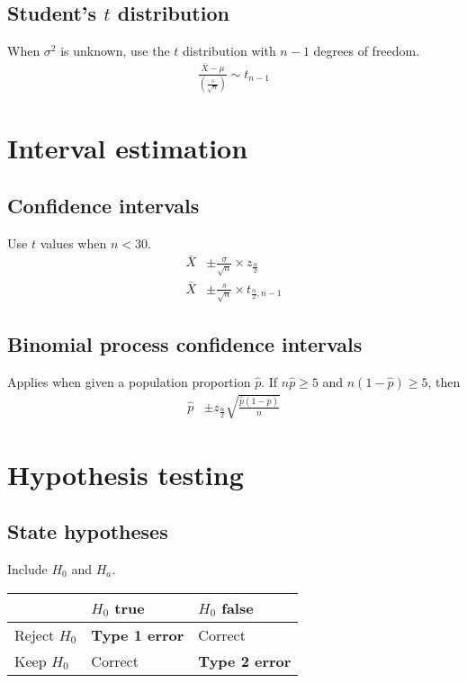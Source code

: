 \documentclass{article}
\newcommand{\soft}[1]{\left( #1 \right)}
\begin{document}
\begin{multicols*}{2}
\subsection{Student's $t$ distribution}
When $\sigma^2$ is unknown, use the $t$ distribution with $n - 1$ degrees of freedom.
\begin{align*}
    \frac{\bar{X} - \mu}{\soft{\frac{s}{\sqrt{n}}}} \sim t_{n - 1}
\end{align*}

\section{Interval estimation}

\subsection{Confidence intervals}
Use $t$ values when $n < 30$.
\begin{align*}
    \bar{X} &\pm \frac{\sigma}{\sqrt{n}} \times z_{\frac{\alpha}{2}} \\
    \bar{X} &\pm \frac{s}{\sqrt{n}} \times t_{\frac{\alpha}{2}, n - 1}
\end{align*}

\subsection{Binomial process confidence intervals}
Applies when given a population proportion $\hat{p}$. If $n\hat{p} \geq 5$ and $n(1 - \hat{p}) \geq 5$, then
\begin{align*}
    \hat{p} &\pm z_{\frac{\alpha}{2}} \sqrt{\frac{\hat{p} (1 - \hat{p})}{n}}
\end{align*}

\section{Hypothesis testing}

\subsection{State hypotheses}
Include $H_0$ and $H_a$.
\begin{center}
    \begin{tabular}{|l|l|l|}
        \hline
                     & $H_0$ true            & $H_0$ false           \\ \hline
        Reject $H_0$ & \textbf{Type 1 error} & Correct               \\ \hline
        Keep $H_0$   & Correct               & \textbf{Type 2 error} \\ \hline
    \end{tabular}
\end{center}


\end{multicols*}
\end{document}
